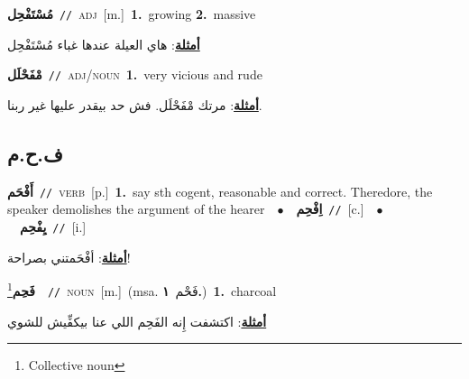 \documentclass[10pt,a4paper,twoside]{article} %
\begin{document}
\begin{multicols}{2}
{\setlength\topsep{0pt}\textbf{\foreignlanguage{arabic}{مُسْتَفْحِل}}\ {\color{gray}\texttt{//}\color{black}}\ \textsc{adj}\ [m.]\ \textbf{1.}~growing  \textbf{2.}~massive\  \begin{flushright}\color{gray}\foreignlanguage{arabic}{\textbf{\underline{\foreignlanguage{arabic}{أمثلة}}}: هاي العيلة عندها غباء مُسْتَفْحِل}\end{flushright}\color{black}} \vspace{2mm}

{\setlength\topsep{0pt}\textbf{\foreignlanguage{arabic}{مْفَحْلَل}}\ {\color{gray}\texttt{//}\color{black}}\ \textsc{adj/noun}\ \textbf{1.}~very vicious and rude\  \begin{flushright}\color{gray}\foreignlanguage{arabic}{\textbf{\underline{\foreignlanguage{arabic}{أمثلة}}}: مرتك مْفَحْلَل. فش حد بيقدر عليها غير ربنا.}\end{flushright}\color{black}} \vspace{2mm}

\vspace{-3mm}
\subsection*{\color{blue}\foreignlanguage{arabic}{ف.ح.م}\color{blue}{}} 

{\setlength\topsep{0pt}\textbf{\foreignlanguage{arabic}{أَفْحَم}}\ {\color{gray}\texttt{//}\color{black}}\ \textsc{verb}\ [p.]\ \textbf{1.}~say sth cogent, reasonable and correct. Theredore, the speaker demolishes the argument of the hearer\ \ $\bullet$\ \ \setlength\topsep{0pt}\textbf{\foreignlanguage{arabic}{اِفْحِم}}\ {\color{gray}\texttt{//}\color{black}}\ [c.]\ \ $\bullet$\ \ \setlength\topsep{0pt}\textbf{\foreignlanguage{arabic}{يِفْحِم}}\ {\color{gray}\texttt{//}\color{black}}\ [i.]\  \begin{flushright}\color{gray}\foreignlanguage{arabic}{\textbf{\underline{\foreignlanguage{arabic}{أمثلة}}}: أفْحَمتني بصراحة!}\end{flushright}\color{black}} \vspace{2mm}

{\setlength\topsep{0pt}\textbf{\foreignlanguage{arabic}{فَحِم}}\footnote{Collective noun}\ \ {\color{gray}\texttt{//}\color{black}}\ \textsc{noun}\ [m.]\ \color{gray}(msa. \foreignlanguage{arabic}{فَحْم}~\foreignlanguage{arabic}{\textbf{١.}})\color{black}\ \textbf{1.}~charcoal\  \begin{flushright}\color{gray}\foreignlanguage{arabic}{\textbf{\underline{\foreignlanguage{arabic}{أمثلة}}}: اكتشفت إِنه الفَحِم اللي عنا بيكفِّيش للشوي}\end{flushright}\color{black}} \vspace{2mm}


\end{multicols}
\end{document}
